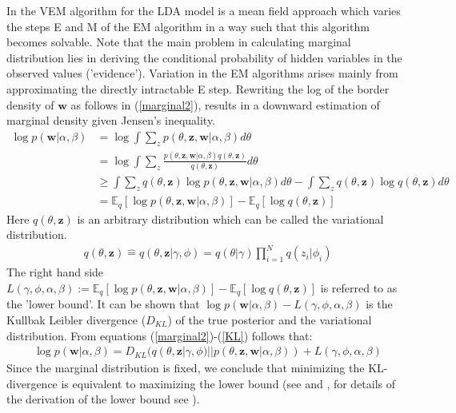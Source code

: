 \documentclass[11pt,a4paper]{article}
\begin{document}
In the VEM algorithm for the LDA model is a mean field approach which varies the steps E and M of the EM algorithm in a way such that this algorithm becomes solvable. Note that the main problem in calculating marginal distribution lies in deriving the conditional probability of hidden variables in the observed values ('evidence'). Variation in the EM algorithms arises mainly from approximating the directly intractable E step.  Rewriting the log of the border density of $\textbf{w}$ as follows in (\ref{marginal2}), results in a downward estimation of marginal density given Jensen's inequality.
\begin{align}\label{marginal2}
\log p(\textbf{w}|\alpha, \beta) &= \log \int \sum_{z} 
p(\theta,\textbf{z},\textbf{w}|\alpha,\beta)d\theta\\
& =\log \int \sum_{z} \frac{p(\theta,\textbf{z},\textbf{w}|\alpha,\beta) q(\theta,\textbf{z})}{q(\theta,\textbf{z})}d\theta\\
&\geq \int \sum_{z} q(\theta,\textbf{z})\log p(\theta,\textbf{z},\textbf{w}|\alpha,\beta) d\theta - 
\int \sum_{z} q(\theta,\textbf{z})\log q(\theta,\textbf{z})d\theta\\
&= \mathbb{E}_q[\log p(\theta,\textbf{z},\textbf{w}|\alpha,\beta) ]-
\mathbb{E}_q[\log q(\theta,\textbf{z})] \label{KL}
\end{align}
Here $q(\theta,\textbf{z})$ is an arbitrary distribution which can be called the variational distribution. 
\begin{align}
q(\theta,\textbf{z})\widehat{=}q(\theta,\textbf{z}|\gamma,\phi)
=q(\theta|\gamma) \prod_{i=1}^N q(z_i|\phi_i)
\end{align}
The right hand side $L(\gamma,\phi,\alpha, \beta):=\mathbb{E}_q[\log p(\theta,\textbf{z},\textbf{w}|\alpha,\beta) ]-
\mathbb{E}_q[\log q(\theta,\textbf{z})]$ is referred to as the 'lower bound'. It can be shown that $\log p(\textbf{w}|\alpha, \beta) - L(\gamma,\phi,\alpha, \beta)$ is the Kullbak Leibler divergence ($D_{KL}$) of the true posterior and the variational distribution. From equations (\ref{marginal2})-(\ref{KL}) follows that:
\begin{align}\label{equality}
\log p(\textbf{w}|\alpha, \beta)= D_{KL}(q(\theta,\textbf{z}|\gamma,\phi)||p(\theta,\textbf{z},\textbf{w}|\alpha,\beta)) + L(\gamma,\phi,\alpha, \beta)
\end{align}
Since the marginal distribution is fixed, we conclude that minimizing the KL-divergence is equivalent to maximizing the lower bound (see \cite{Jordan1999} and \cite{Wainwright2008}, for details of the derivation of the lower bound see \cite{Blei2003}).
\end{document}
